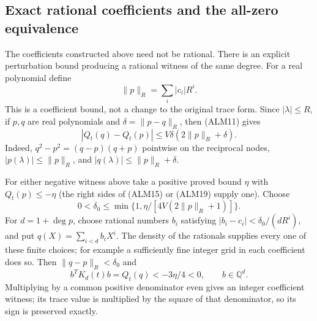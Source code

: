 \subsection{Exact rational coefficients and the all-zero equivalence}

The coefficients constructed above need not be rational. There is an
explicit perturbation bound producing a rational witness of the same
degree. For a real polynomial define
\begin{equation}\tag{ALM20}
 \|p\|_R=\sum_i|c_i|R^i.
\end{equation}
This is a coefficient bound, not a change to the original trace form.
Since $|\lambda|\le R$, if $p,q$ are real polynomials and
$\delta=\|p-q\|_R$, then (ALM11) gives
\begin{equation}\tag{ALM21}
 |Q_t(q)-Q_t(p)|
 \le V\delta(2\|p\|_R+\delta).
\end{equation}
Indeed, $q^2-p^2=(q-p)(q+p)$ pointwise on the reciprocal nodes,
$|p(\lambda)|\le\|p\|_R$, and
$|q(\lambda)|\le\|p\|_R+\delta$.

For either negative witness above take a positive proved bound
$\eta$ with $Q_t(p)\le-\eta$ (the right sides of (ALM15) or (ALM19)
supply one). Choose
\begin{equation}\tag{ALM22}
 0<\delta_0\le\min\{1,\eta/[4V(2\|p\|_R+1)]\}.
\end{equation}
For $d=1+\deg p$, choose rational numbers $b_i$ satisfying
$|b_i-c_i|<\delta_0/(dR^i)$, and put $q(X)=\sum_{i<d}b_iX^i$.
The density of the rationals supplies every one of these finite
choices; for example a sufficiently fine integer grid in each
coefficient does so. Then $\|q-p\|_R<\delta_0$ and
\begin{equation}\tag{ALM23}
 b^TK_d(t)b=Q_t(q)<-3\eta/4<0,\qquad b\in\mathbb Q^d.
\end{equation}
Multiplying by a common positive denominator even gives an integer
coefficient witness; its trace value is multiplied by the square of
that denominator, so its sign is preserved exactly.

